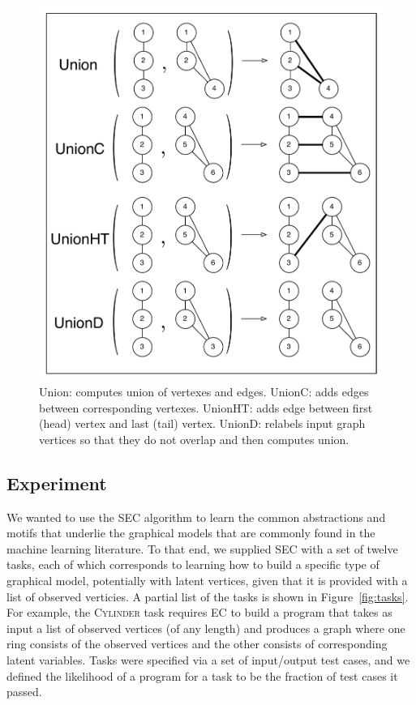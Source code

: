 \documentclass{article} %
\begin{document}
\begin{figure}[h]
\begin{minipage}[t]{.5\textwidth}
  \includegraphics[width=\linewidth]{./figures/GraphCombinators.pdf}
  \caption{Union: computes union of vertexes and edges. UnionC: adds edges between corresponding vertexes. UnionHT: adds edge between first (head) vertex and last (tail) vertex. UnionD: relabels input graph vertices so that they do not overlap and then computes union.}
  \label{fig:graphcomb}\par\vfill
\end{minipage}
\end{figure}

\subsection{Experiment}

We wanted to use the SEC algorithm to learn the common abstractions and motifs that underlie the graphical models that are commonly found in the machine learning literature. To that end, we supplied SEC with a set of twelve tasks, each of which corresponds to learning how to build a specific type of graphical model, potentially with latent vertices, given that it is provided with a list of observed verticies. A partial list of the tasks is shown in Figure~\ref{fig:tasks}. For example, the \textsc{Cylinder} task requires EC to build a program that takes as input a list of observed vertices (of any length) and produces a graph where one ring consists of the observed vertices and the other consists of corresponding latent variables. 
Tasks were specified via a set of input/output test cases, and we defined the likelihood of a program for a task to be the fraction of test cases it passed. 
\end{document}
